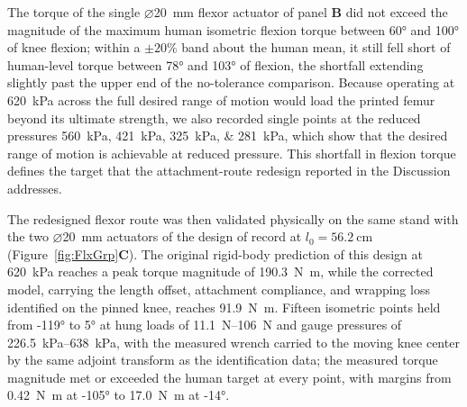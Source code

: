 \documentclass[utf8]{FrontiersinHarvard} %
\begin{document}
The torque of the single $\diameter$\qty{20}{\mm} flexor actuator of panel \textbf{B} did not exceed the magnitude of the maximum human isometric flexion torque \citep{delp_interactive_1990,seth_opensim_2018} between \ang{60} and \ang{100} of knee flexion; within a $\pm 20\%$ band about the human mean, it still fell short of human-level torque between \ang{78} and \ang{103} of flexion, the shortfall extending slightly past the upper end of the no-tolerance comparison. Because operating at \qty{620}{\kPa} across the full desired range of motion would load the printed femur beyond its ultimate strength, we also recorded single points at the reduced pressures \qtylist{560;421;325;281}{\kPa}, which show that the desired range of motion is achievable at reduced pressure. This shortfall in flexion torque defines the target that the attachment-route redesign reported in the Discussion addresses.

The redesigned flexor route was then validated physically on the same stand with the two $\diameter$\qty{20}{\mm} actuators of the design of record at $l_{0}=\qty{56.2}{\cm}$ (Figure~\ref{fig:FlxGrp}\textbf{C}). The original rigid-body prediction of this design at \qty{620}{\kPa} reaches a peak torque magnitude of \qty{190.3}{\newton\meter}, while the corrected model, carrying the length offset, attachment compliance, and wrapping loss identified on the pinned knee, reaches \qty{91.9}{\newton\meter}. Fifteen isometric points held from \ang{-119} to \ang{5} at hung loads of \qtyrange{11.1}{106}{\newton} and gauge pressures of \qtyrange{226.5}{638}{\kPa}, with the measured wrench carried to the moving knee center by the same adjoint transform as the identification data; the measured torque magnitude met or exceeded the human target at every point, with margins from \qty{0.42}{\newton\meter} at \ang{-105} to \qty{17.0}{\newton\meter} at \ang{-14}.
\end{document}
